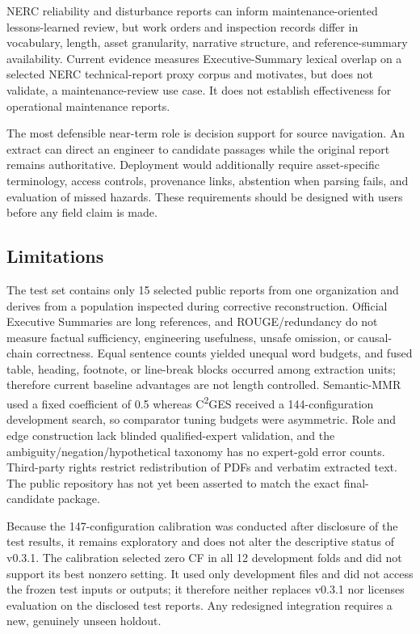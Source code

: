 \documentclass[applsci,article,submit,moreauthors]{Definitions/mdpi}
\newcommand{\cges}{C\textsuperscript{2}GES}
\begin{document}
NERC reliability and disturbance reports can inform maintenance-oriented lessons-learned review, but work orders and inspection records differ in vocabulary, length, asset granularity, narrative structure, and reference-summary availability. Current evidence measures Executive-Summary lexical overlap on a selected NERC technical-report proxy corpus and motivates, but does not validate, a maintenance-review use case. It does not establish effectiveness for operational maintenance reports.

The most defensible near-term role is decision support for source navigation. An extract can direct an engineer to candidate passages while the original report remains authoritative. Deployment would additionally require asset-specific terminology, access controls, provenance links, abstention when parsing fails, and evaluation of missed hazards. These requirements should be designed with users before any field claim is made.

\subsection{Limitations}

The test set contains only 15 selected public reports from one organization and derives from a population inspected during corrective reconstruction. Official Executive Summaries are long references, and ROUGE/redundancy do not measure factual sufficiency, engineering usefulness, unsafe omission, or causal-chain correctness. Equal sentence counts yielded unequal word budgets, and fused table, heading, footnote, or line-break blocks occurred among extraction units; therefore current baseline advantages are not length controlled. Semantic-MMR used a fixed coefficient of 0.5 whereas \cges{} received a 144-configuration development search, so comparator tuning budgets were asymmetric. Role and edge construction lack blinded qualified-expert validation, and the ambiguity/negation/hypothetical taxonomy has no expert-gold error counts. Third-party rights restrict redistribution of PDFs and verbatim extracted text. The public repository has not yet been asserted to match the exact final-candidate package.

Because the 147-configuration calibration was conducted after disclosure of the test results, it remains exploratory and does not alter the descriptive status of v0.3.1. The calibration selected zero CF in all 12 development folds and did not support its best nonzero setting. It used only development files and did not access the frozen test inputs or outputs; it therefore neither replaces v0.3.1 nor licenses evaluation on the disclosed test reports. Any redesigned integration requires a new, genuinely unseen holdout.
\end{document}
